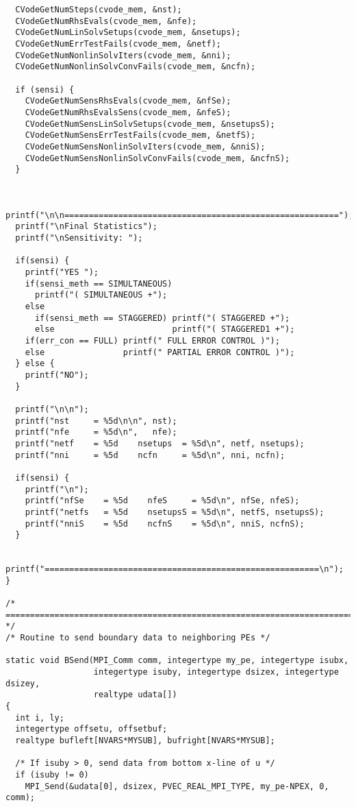 \begin{verbatim}
  CVodeGetNumSteps(cvode_mem, &nst);
  CVodeGetNumRhsEvals(cvode_mem, &nfe);
  CVodeGetNumLinSolvSetups(cvode_mem, &nsetups);
  CVodeGetNumErrTestFails(cvode_mem, &netf);
  CVodeGetNumNonlinSolvIters(cvode_mem, &nni);
  CVodeGetNumNonlinSolvConvFails(cvode_mem, &ncfn);

  if (sensi) {
    CVodeGetNumSensRhsEvals(cvode_mem, &nfSe);
    CVodeGetNumRhsEvalsSens(cvode_mem, &nfeS);
    CVodeGetNumSensLinSolvSetups(cvode_mem, &nsetupsS);
    CVodeGetNumSensErrTestFails(cvode_mem, &netfS);
    CVodeGetNumSensNonlinSolvIters(cvode_mem, &nniS);
    CVodeGetNumSensNonlinSolvConvFails(cvode_mem, &ncfnS);
  }
  

  printf("\n\n========================================================");
  printf("\nFinal Statistics");
  printf("\nSensitivity: ");

  if(sensi) {
    printf("YES ");
    if(sensi_meth == SIMULTANEOUS)   
      printf("( SIMULTANEOUS +");
    else 
      if(sensi_meth == STAGGERED) printf("( STAGGERED +");
      else                        printf("( STAGGERED1 +");                      
    if(err_con == FULL) printf(" FULL ERROR CONTROL )");
    else                printf(" PARTIAL ERROR CONTROL )");
  } else {
    printf("NO");
  }

  printf("\n\n");
  printf("nst     = %5d\n\n", nst);
  printf("nfe     = %5d\n",   nfe);
  printf("netf    = %5d    nsetups  = %5d\n", netf, nsetups);
  printf("nni     = %5d    ncfn     = %5d\n", nni, ncfn);

  if(sensi) {
    printf("\n");
    printf("nfSe    = %5d    nfeS     = %5d\n", nfSe, nfeS);
    printf("netfs   = %5d    nsetupsS = %5d\n", netfS, nsetupsS);
    printf("nniS    = %5d    ncfnS    = %5d\n", nniS, ncfnS);
  }

  printf("========================================================\n");
}

/* ======================================================================= */
/* Routine to send boundary data to neighboring PEs */

static void BSend(MPI_Comm comm, integertype my_pe, integertype isubx, 
                  integertype isuby, integertype dsizex, integertype dsizey, 
                  realtype udata[])
{
  int i, ly;
  integertype offsetu, offsetbuf;
  realtype bufleft[NVARS*MYSUB], bufright[NVARS*MYSUB];

  /* If isuby > 0, send data from bottom x-line of u */
  if (isuby != 0)
    MPI_Send(&udata[0], dsizex, PVEC_REAL_MPI_TYPE, my_pe-NPEX, 0, comm);


\end{verbatim}
